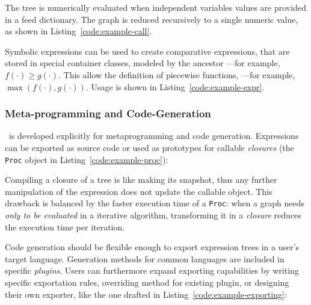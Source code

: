 \noindent%


The tree is numerically evaluated when independent variables values are provided in a feed dictionary. The graph is reduced recursively to a single numeric value, as shown in Listing~\ref{code:example-call}.

\noindent%



Symbolic expressions can be used to create comparative expressions, that are stored in special container classes, modeled by the ancestor \CASExpression---for example, $f(\cdot) \geq g(\cdot)$. This allow the definition of piecewise functions, ---for example, $\max(f(\cdot), g(\cdot))$. Usage is shown in Listing~\ref{code:example-expr}.

\noindent%


\subsubsection{Meta-programming and Code-Generation}

\ragnicas~is developed explicitly for {meta\-programming} and code generation. Expressions can be exported as source code or used as prototypes for callable \emph{closures} (the \texttt{Proc} object in Listing~\ref{code:example-proc}):

\noindent%


Compiling a closure of a tree is like making its snapshot, thus any further manipulation of the expression does not update the callable object. This drawback is balanced by the faster execution time of a \texttt{Proc}: when a graph needs \emph{only to be evaluated} in a iterative algorithm, transforming it in a \emph{closure} reduces the execution time per iteration.

Code generation should be flexible enough to export expression trees in a user's target language. Generation methods for common languages are included in specific \emph{plugins}. Users can furthermore expand exporting capabilities by writing specific exportation rules, overriding method for existing plugin, or designing their own exporter, like the one drafted in Listing~\ref{code:example-exporting}:

\noindent%

